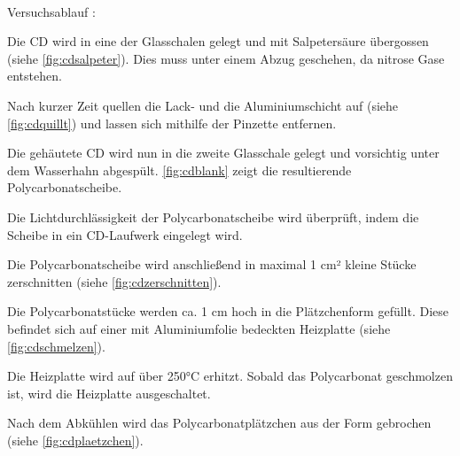 \\Versuchsablauf \cite{cdversuch}:
\begin{compactenum}
    \item Die CD wird in eine der Glasschalen gelegt und mit Salpetersäure übergossen (siehe \autoref{fig:cdsalpeter}). Dies muss unter einem Abzug geschehen, da nitrose Gase entstehen.
    \item Nach kurzer Zeit \glqq quellen\grqq{} die Lack- und die Aluminiumschicht auf (siehe \autoref{fig:cdquillt}) und lassen sich mithilfe der Pinzette entfernen.
    \item Die \glqq gehäutete\grqq{} CD wird nun in die zweite Glasschale gelegt und vorsichtig unter dem Wasserhahn abgespült. \autoref{fig:cdblank} zeigt die resultierende Polycarbonatscheibe.
    \item Die Lichtdurchlässigkeit der Polycarbonatscheibe wird überprüft, indem die Scheibe in ein CD-Laufwerk eingelegt wird.
    \item Die Polycarbonatscheibe wird anschließend in maximal 1 cm² kleine Stücke zerschnitten (siehe \autoref{fig:cdzerschnitten}).
    \item Die Polycarbonatstücke werden ca. 1 cm hoch in die Plätzchenform gefüllt. Diese befindet sich auf einer mit Aluminiumfolie bedeckten Heizplatte (siehe \autoref{fig:cdschmelzen}).
    \item Die Heizplatte wird auf über 250°C erhitzt. Sobald das Polycarbonat geschmolzen ist, wird die Heizplatte ausgeschaltet.
    \item Nach dem Abkühlen wird das \glqq Polycarbonatplätzchen\grqq{} aus der Form gebrochen (siehe \autoref{fig:cdplaetzchen}).
\end{compactenum}

